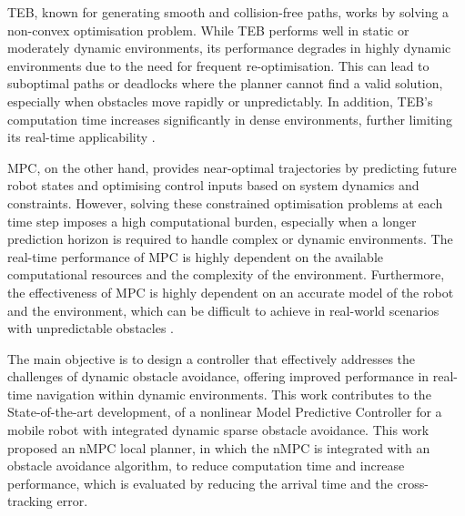 \documentclass[conference]{IEEEtran}
\begin{document}
TEB, known for generating smooth and collision-free paths, works by solving a non-convex optimisation problem. While TEB performs well in static or moderately dynamic environments, its performance degrades in highly dynamic environments due to the need for frequent re-optimisation. This can lead to suboptimal paths or deadlocks where the planner cannot find a valid solution, especially when obstacles move rapidly or unpredictably. In addition, TEB's computation time increases significantly in dense environments, further limiting its real-time applicability \cite{ASAP, MPCvsTEB}.

MPC, on the other hand, provides near-optimal trajectories by predicting future robot states and optimising control inputs based on system dynamics and constraints. However, solving these constrained optimisation problems at each time step imposes a high computational burden, especially when a longer prediction horizon is required to handle complex or dynamic environments. The real-time performance of MPC is highly dependent on the available computational resources and the complexity of the environment. Furthermore, the effectiveness of MPC is highly dependent on an accurate model of the robot and the environment, which can be difficult to achieve in real-world scenarios with unpredictable obstacles \cite{ASAP, MPCvsTEB}.

The main objective is to design a controller that effectively addresses the challenges of dynamic obstacle avoidance, offering improved performance in real-time navigation within dynamic environments. This work contributes to the State-of-the-art development, of a nonlinear Model Predictive Controller for a mobile robot with integrated dynamic sparse obstacle avoidance. This work proposed an nMPC local planner, in which the nMPC is integrated with an obstacle avoidance algorithm, to reduce computation time and increase performance, which is evaluated by reducing the arrival time and the cross-tracking error.


\end{document}
